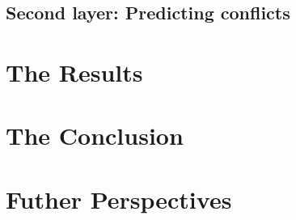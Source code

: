 \documentclass[a4paper]{article}
\begin{document}




\subsection{Second layer: Predicting conflicts}

\section{The Results}


\section{The Conclusion}

\section{Futher Perspectives}






\end{document}
